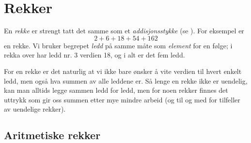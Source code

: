 \section{Rekker}
En \textit{rekke} er strengt tatt det samme som et \textit{addisjonsstykke} (se \mb). For eksempel er
\[ 2+6+18+54+162 \]
en rekke. Vi bruker begrepet \textit{ledd} på samme måte som \textit{element} for en følge; i rekka over har ledd nr. 3 verdien 18, og i alt er det fem ledd.\vsk

For en rekke er det naturlig at vi ikke bare ønsker å vite verdien til hvert enkelt ledd, men også hva summen av alle leddene er. Så lenge en rekke ikke er uendelig, kan man alltids legge sammen ledd for ledd, men for noen rekker finnes det uttrykk som gir oss summen etter mye mindre arbeid (og til og med for tilfeller av uendelige rekker).

\subsection{Aritmetiske rekker}
 \regv

